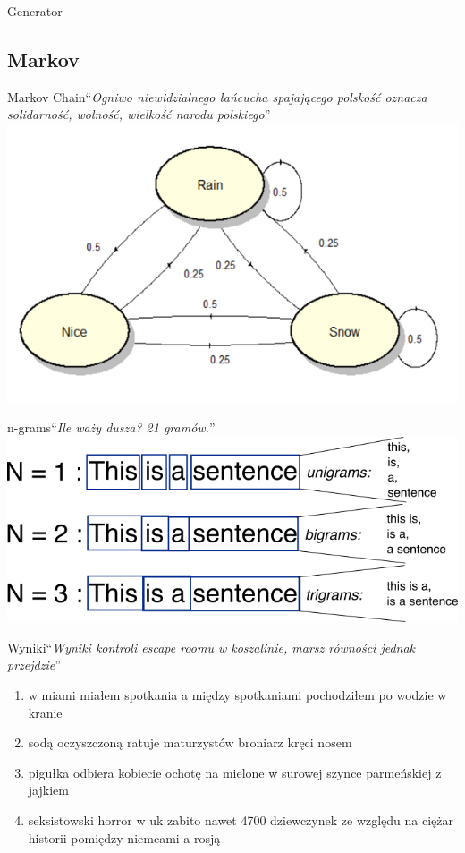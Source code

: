 \documentclass[14pt]{beamer}
\newcommand{\fakehead}[1]{``\textit{#1}''}
\begin{document}
\begin{section}{Generator}
	\subsection{Markov}
	\begin{frame}{Markov Chain}{\fakehead{Ogniwo niewidzialnego łańcucha spajającego polskość oznacza solidarność, wolność, wielkość narodu polskiego}}
		\centering
		\includegraphics[width=0.8\linewidth]{markov.png}
	\end{frame}
	\begin{frame}{n-grams}{\fakehead{Ile waży dusza? 21 gramów.}}
		\centering
		\includegraphics[width=0.8\linewidth]{ngrams.png}
	\end{frame}
	\begin{frame}{Wyniki}{\fakehead{Wyniki kontroli escape roomu w koszalinie, marsz równości jednak przejdzie}
			}
		\begin{enumerate}
			\item w miami miałem spotkania a między spotkaniami pochodziłem po wodzie w kranie 
			\item sodą oczyszczoną ratuje maturzystów broniarz kręci nosem
			\item pigułka odbiera kobiecie ochotę na mielone w surowej szynce parmeńskiej z jajkiem  
			\item seksistowski horror w uk zabito nawet 4700 dziewczynek ze względu na ciężar historii pomiędzy niemcami a rosją 
		\end{enumerate}
	\end{frame}
\end{section}
\end{document}
